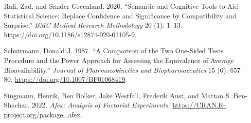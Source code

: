 \documentclass[
]{interact}
\newlength{\cslhangindent}
\newlength{\cslentryspacingunit} %
\newenvironment{CSLReferences}[2] %
 {%
  \setlength{\parindent}{0pt}
  \ifodd #1
  \let\oldpar\par
  \def\par{\hangindent=\cslhangindent\oldpar}
  \fi
  \setlength{\parskip}{#2\cslentryspacingunit}
 }%
 {}
\begin{document}
\begin{CSLReferences}{1}{0}
\leavevmode{}%
Rafi, Zad, and Sander Greenland. 2020. {``Semantic and Cognitive Tools
to Aid Statistical Science: Replace Confidence and Significance by
Compatibility and Surprise.''} \emph{BMC Medical Research Methodology}
20 (1): 1--13. \url{https://doi.org/10.1186/s12874-020-01105-9}.

\leavevmode{}%
Schuirmann, Donald J. 1987. {``A Comparison of the Two One-Sided Tests
Procedure and the Power Approach for Assessing the Equivalence of
Average Bioavailability.''} \emph{Journal of Pharmacokinetics and
Biopharmaceutics} 15 (6): 657--80.
\url{https://doi.org/10.1007/BF01068419}.

\leavevmode{}%
Singmann, Henrik, Ben Bolker, Jake Westfall, Frederik Aust, and Mattan
S. Ben-Shachar. 2022. \emph{Afex: Analysis of Factorial Experiments}.
\url{https://CRAN.R-project.org/package=afex}.

\end{CSLReferences}
\end{document}
